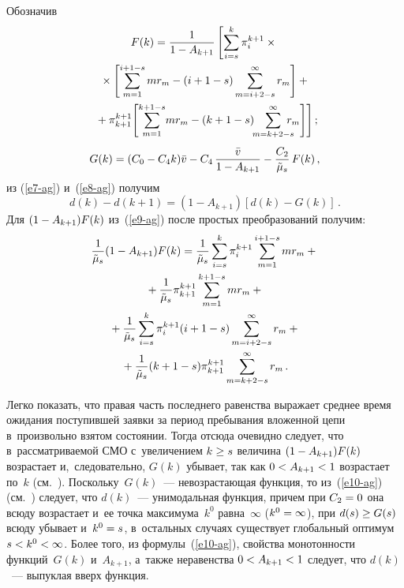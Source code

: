 \begin{multicols}{2}
Обозначив
\begin{multline}
F(k) =
\fr{1}{1 - A_{k+1}}
\left[  \sum\limits^k_{i=s} \pi^{k+1}_i \times{}\right.\\
{}\times \left[\sum\limits_{m=1}^{i+1-s} mr_m - (i+1-s) \sum\limits_{m=i+2-s}^{\infty}
r_m\right] +{}\\
\left.{}+ \pi^{k+1}_{k+1}\! \left[\sum\limits_{m=1}^{k+1-s} \! mr_m
- (k +1 -s) \!\!\sum\limits_{m=k+2-s}^{\infty}\!\!\!\!\! r_m\right]\right];\!
\label{e9-ag}
\end{multline}
$$
G(k) = (C_0 -C_4 k)\bar{v} - C_4 \, \displaystyle\frac{\displaystyle \bar{v}\mathstrut}{\displaystyle 1 -
A_{k+1}\mathstrut} - \displaystyle\frac{\displaystyle C_2\mathstrut}{\displaystyle \tilde{\mu}_s\mathstrut}\, F(k)\,,
$$
из (\ref{e7-ag}) и~(\ref{e8-ag}) получим
\begin{equation}
d(k)-d(k+1)=\left(1-A_{k+1}\right)[d(k)-G(k)]\,.
\label{e10-ag}
\end{equation}
Для $(1\hm- A_{k+1})F(k)$ из~(\ref{e9-ag}) после простых преобразований
получим:
\begin{multline*}
\displaystyle\frac{\displaystyle 1\mathstrut}{\displaystyle \tilde{\mu}_s\mathstrut}(1 - A_{k+1}) F(k) =
\displaystyle\frac{\displaystyle 1\mathstrut}{\displaystyle \tilde{\mu}_s\mathstrut} \sum\limits^k_{i=s} \pi^{k+1}_i \sum\limits_{m=1}^{i+1-s} mr_m +{}\\
{}+ \displaystyle\frac{\displaystyle 1\mathstrut}{\displaystyle \tilde{\mu}_s\mathstrut} \pi^{k+1}_{k+1} \sum\limits_{m=1}^{k+1-s} mr_m +{}\\
{}+ \displaystyle\frac{\displaystyle 1\mathstrut}{\displaystyle \tilde{\mu}_s\mathstrut} \sum\limits^k_{i=s} \pi^{k+1}_i (i +1 -s)
\sum\limits_{m=i+2-s}^{\infty} r_m +{}\\
{}+ \displaystyle\frac{\displaystyle 1\mathstrut}{\displaystyle \tilde{\mu}_s\mathstrut} ( k +1 -s) \pi^{k+1}_{k+1}
\sum\limits_{m=k+2-s}^{\infty} r_m\,.
\end{multline*}

Легко показать, что правая часть последнего равенства выражает среднее время
ожидания поступившей заявки за период пребывания вложенной цепи
в~произвольно взятом состоянии. Тогда отсюда очевидно следует, что
в~рассматриваемой СМО с~увеличением $k\hm\geq s$ величина
$(1\hm- A_{k+1})F(k)$ возрастает и,~следовательно, $G(k)$ убывает, так как
$0\hm< A_{k+1}\hm< 1$ возрастает по~$k$ (см.~\cite{11-ag}).
Поскольку~$G(k)$~--- невозрастающая функция, то из~(\ref{e10-ag})
(см.~\cite{13-ag}) следует, что $d(k)$~--- унимодальная функция, причем при
$C_2\hm=0$ она всюду возрастает и~ее точка максимума~$k^0$
равна~$\infty$ ($k^0\hm=\infty$), при $d(s)\hm\geq G(s)$ всюду убывает
и~$k^0\hm=s$, в~остальных случаях существует глобальный оптимум
$s\hm<k^0\hm<\infty$. Более того, из формулы~(\ref{e10-ag}), свойства
монотонности функций~$G(k)$ и~$A_{k+1}$, а~также неравенства
$0\hm<A_{k+1}\hm<1$ следует, что $d(k)$~--- выпуклая вверх функция.


\end{multicols}
